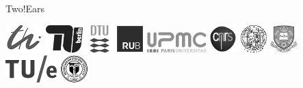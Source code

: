 \documentclass{beamer}
\begin{document}
\begin{frame}{Two!Ears}
\begin{center}
        \includegraphics[width=.05\textwidth]{fig/tuil}\hspace{0.2cm}
        \includegraphics[width=.05\textwidth]{fig/tub}\hspace{0.2cm}
        \includegraphics[width=.039\textwidth]{fig/dtu}\hspace{0.2cm}
        \includegraphics[width=.04\textwidth]{fig/rub}\hspace{0.2cm}
        \includegraphics[width=.06\textwidth]{fig/upmc}\hspace{0.2cm}
        \includegraphics[width=.04\textwidth]{fig/cnrs}\hspace{0.2cm}
        \includegraphics[width=.04\textwidth]{fig/uro}\hspace{0.2cm}
        \includegraphics[width=.04\textwidth]{fig/usf}\hspace{0.2cm}
        \includegraphics[width=.055\textwidth]{fig/tue}\hspace{0.2cm}
        \includegraphics[width=.04\textwidth]{fig/rensselaer}

        \vspace{1.0cm}


\end{center}
\end{frame}
\end{document}

